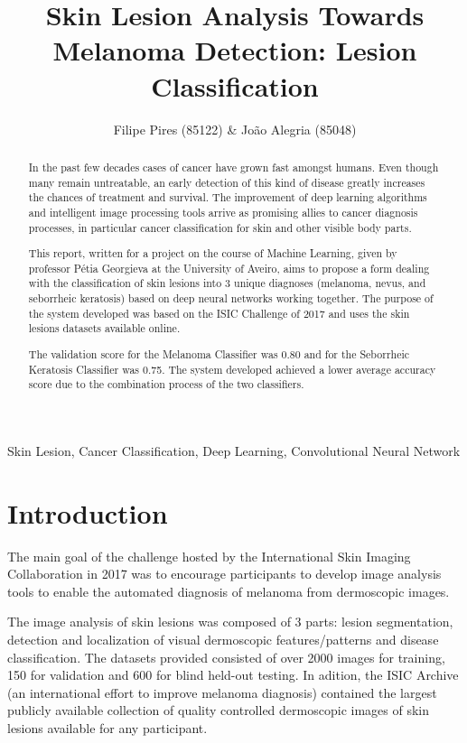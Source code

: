 \documentclass[10pt]{IEEEtran}
\title{Skin Lesion Analysis Towards Melanoma Detection: Lesion Classification}
\author{Filipe Pires (85122) \& João Alegria (85048)}
\begin{document}
\maketitle

\begin{abstract}

In the past few decades cases of cancer have grown fast amongst humans. 
Even though many remain untreatable, an early detection of this kind of disease greatly increases the chances of treatment and survival.
The improvement of deep learning algorithms and intelligent image processing tools arrive as promising allies to cancer diagnosis processes, in particular cancer classification for skin and other visible body parts.

This report, written for a project on the course of Machine Learning, given by professor Pétia Georgieva at the University of Aveiro, aims to propose a form dealing with the classification of skin lesions into 3 unique diagnoses (melanoma, nevus, and seborrheic keratosis) based on deep neural networks working together. 
The purpose of the system developed was based on the ISIC Challenge of 2017 and uses the skin lesions datasets available online.

The validation score for the Melanoma Classifier was 0.80 and for the Seborrheic Keratosis Classifier was 0.75.
The system developed achieved a lower average accuracy score due to the combination process of the two classifiers.

\end{abstract}

\begin{IEEEkeywords}
Skin Lesion, Cancer Classification, Deep Learning, Convolutional Neural Network
\end{IEEEkeywords}

\section{\textbf{Introduction}} %

The main goal of the challenge hosted by the International Skin Imaging Collaboration in 2017 was to encourage participants to develop image analysis tools to enable the automated diagnosis of melanoma from dermoscopic images. 

The image analysis of skin lesions was composed of 3 parts: lesion segmentation, detection and localization of visual dermoscopic features/patterns and disease classification. 
The datasets provided consisted of over 2000 images for training, 150 for validation and 600 for blind held-out testing.
In adition, the ISIC Archive (an international effort to improve melanoma diagnosis) contained the largest publicly available collection of quality controlled dermoscopic images of skin lesions available for any participant.
\end{document}
